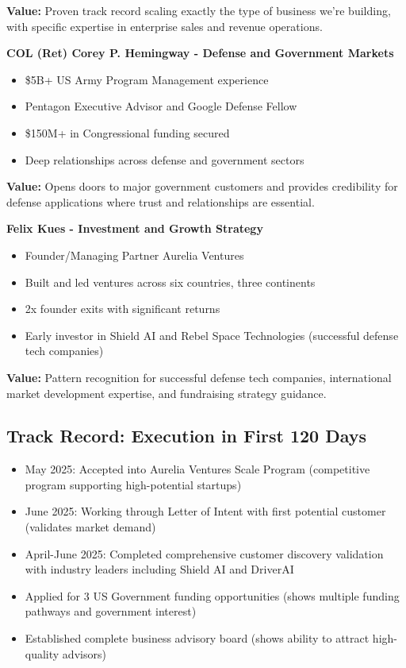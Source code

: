 \documentclass[11pt,letterpaper]{article}
\begin{document}
\textbf{Value:} Proven track record scaling exactly the type of business we're building, with specific expertise in enterprise sales and revenue operations.

\textbf{COL (Ret) Corey P. Hemingway - Defense and Government Markets}
\begin{itemize}[leftmargin=10pt, itemsep=1pt]
    \item \$5B+ US Army Program Management experience
    \item Pentagon Executive Advisor and Google Defense Fellow
    \item \$150M+ in Congressional funding secured
    \item Deep relationships across defense and government sectors
\end{itemize}

\textbf{Value:} Opens doors to major government customers and provides credibility for defense applications where trust and relationships are essential.

\textbf{Felix Kues - Investment and Growth Strategy}
\begin{itemize}[leftmargin=10pt, itemsep=1pt]
    \item Founder/Managing Partner Aurelia Ventures
    \item Built and led ventures across six countries, three continents
    \item 2x founder exits with significant returns
    \item Early investor in Shield AI and Rebel Space Technologies (successful defense tech companies)
\end{itemize}

\textbf{Value:} Pattern recognition for successful defense tech companies, international market development expertise, and fundraising strategy guidance.

\subsection*{Track Record: Execution in First 120 Days}

\begin{itemize}[leftmargin=10pt, itemsep=1pt]
    \item May 2025: Accepted into Aurelia Ventures Scale Program (competitive program supporting high-potential startups)
    \item June 2025: Working through Letter of Intent with first potential customer (validates market demand)
    \item April-June 2025: Completed comprehensive customer discovery validation with industry leaders including Shield AI and DriverAI
    \item Applied for 3 US Government funding opportunities (shows multiple funding pathways and government interest)
    \item Established complete business advisory board (shows ability to attract high-quality advisors)
\end{itemize}
\end{document}
